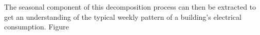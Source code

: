 The seasonal component of this decomposition process can then be extracted to get an understanding of the typical weekly pattern of a building's electrical consumption. Figure
